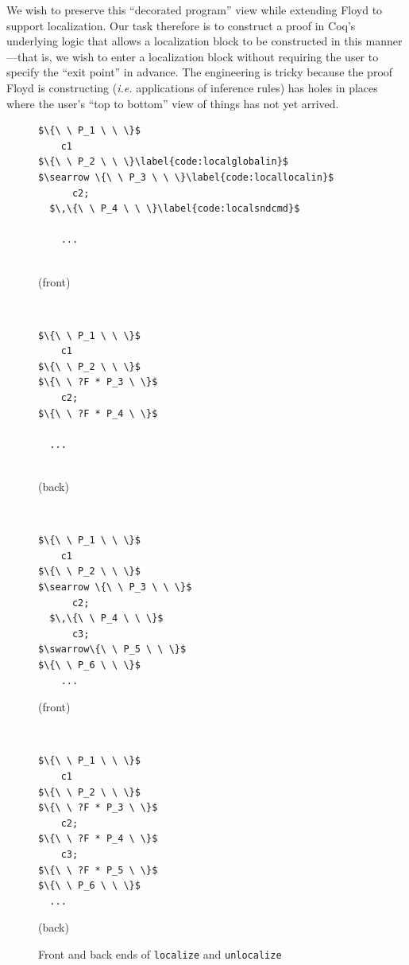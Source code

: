 \documentclass[acmsmall,screen]{acmart}
\newcommand{\li}[1]{{\texttt{\small #1}}}
\begin{document}
We wish to preserve this ``decorated program'' view while extending Floyd to support localization.  Our task therefore is to construct a proof in Coq's underlying logic that allows a localization block to be constructed in this manner---that is, we wish to enter a localization block without requiring the user to specify the ``exit point'' in advance.  The engineering is tricky because the proof Floyd is constructing (\emph{i.e.} applications of inference rules) has holes in places where the user's ``top to bottom'' view of things has not yet arrived.

\begin{figure}
\begin{minipage}{.15\textwidth}
\begin{lstlisting}[basicstyle=\linespread{0.8}\normalfont\footnotesize\tt]
$\{\ \ P_1 \ \ \}$
    c1
$\{\ \ P_2 \ \ \}\label{code:localglobalin}$
$\searrow \{\ \ P_3 \ \ \}\label{code:locallocalin}$
      c2;
  $\,\{\ \ P_4 \ \ \}\label{code:localsndcmd}$

    ...


\end{lstlisting}
\centerline{\footnotesize(front)}
\end{minipage} \vline ~
\begin{minipage}{.15\textwidth}
\begin{lstlisting}[numbers=none, basicstyle=\linespread{0.8}\normalfont\footnotesize\tt]
$\{\ \ P_1 \ \ \}$
    c1
$\{\ \ P_2 \ \ \}$
$\{\ \ ?F * P_3 \ \}$
    c2;
$\{\ \ ?F * P_4 \ \}$

  ...


\end{lstlisting}
\centerline{\footnotesize(back)}
\end{minipage} \vline \vline ~
\begin{minipage}{.15\textwidth}
\begin{lstlisting}[numbers=none, basicstyle=\linespread{0.8}\normalfont\footnotesize\tt]
$\{\ \ P_1 \ \ \}$
    c1
$\{\ \ P_2 \ \ \}$
$\searrow \{\ \ P_3 \ \ \}$
      c2;
  $\,\{\ \ P_4 \ \ \}$
      c3;
$\swarrow\{\ \ P_5 \ \ \}$
$\{\ \ P_6 \ \ \}$
    ...
\end{lstlisting}
\centerline{\footnotesize(front)}
\end{minipage} \vline ~
\begin{minipage}{.15\textwidth}
\begin{lstlisting}[numbers=none, basicstyle=\linespread{0.8}\normalfont\footnotesize\tt]
$\{\ \ P_1 \ \ \}$
    c1
$\{\ \ P_2 \ \ \}$
$\{\ \ ?F * P_3 \ \}$
    c2;
$\{\ \ ?F * P_4 \ \}$
    c3;
$\{\ \ ?F * P_5 \ \}$
$\{\ \ P_6 \ \ \}$
  ...
\end{lstlisting}
\centerline{\footnotesize(back)}
\end{minipage}
\caption{Front and back ends of \li{localize} and \li{unlocalize}}
\label{figure:backend}
\end{figure}
\end{document}

